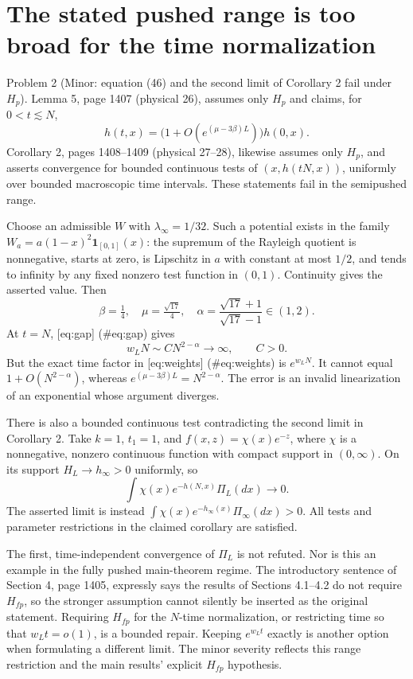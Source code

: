 \documentclass[10pt]{article}
\begin{document}
\section*{The stated pushed range is too broad for the time normalization}
Problem 2 (Minor: equation (46) and the second limit of Corollary 2 fail under \(H_p\)).  Lemma 5, page 1407 (physical 26), assumes only \(H_p\) and claims, for \(0<t\lesssim N\), \[h(t,x)=\bigl(1+O(e^{(\mu-3\beta)L})\bigr)h(0,x).\] Corollary 2, pages 1408–1409 (physical 27–28), likewise assumes only \(H_p\), and asserts convergence for bounded continuous tests of \((x,h(tN,x))\), uniformly over bounded macroscopic time intervals. These statements fail in the semipushed range.\par
Choose an admissible \(W\) with \(\lambda_\infty=1/32\). Such a potential exists in the family \(W_a=a(1-x)^2\mathbf1_{[0,1]}(x)\): the supremum of the Rayleigh quotient is nonnegative, starts at zero, is Lipschitz in \(a\) with constant at most \(1/2\), and tends to infinity by any fixed nonzero test function in \((0,1)\). Continuity gives the asserted value. Then \[\beta=\tfrac14,\quad \mu=\tfrac{\sqrt{17}}4,\quad
 \alpha=\frac{\sqrt{17}+1}{\sqrt{17}-1}\in(1,2).\] At \(t=N\), [eq:gap] (\#eq:gap) gives \[w_LN\sim C N^{2-\alpha}\longrightarrow\infty,\qquad C>0.\] But the exact time factor in [eq:weights] (\#eq:weights) is \(e^{w_LN}\). It cannot equal \(1+O(N^{2-\alpha})\), whereas \(e^{(\mu-3\beta)L}=N^{2-\alpha}\). The error is an invalid linearization of an exponential whose argument diverges.\par
There is also a bounded continuous test contradicting the second limit in Corollary 2. Take \(k=1\), \(t_1=1\), and \(f(x,z)=\chi(x)e^{-z}\), where \(\chi\) is a nonnegative, nonzero continuous function with compact support in \((0,\infty)\). On its support \(H_L\to h_\infty>0\) uniformly, so \[\int \chi(x)e^{-h(N,x)}\Pi_L(dx)\longrightarrow0.\] The asserted limit is instead \(\int\chi(x)e^{-h_\infty(x)}\Pi_\infty(dx)>0\). All tests and parameter restrictions in the claimed corollary are satisfied.\par
The first, time-independent convergence of \(\Pi_L\) is not refuted. Nor is this an example in the fully pushed main-theorem regime. The introductory sentence of Section 4, page 1405, expressly says the results of Sections 4.1–4.2 do not require \(H_{fp}\), so the stronger assumption cannot silently be inserted as the original statement. Requiring \(H_{fp}\) for the \(N\)-time normalization, or restricting time so that \(w_Lt=o(1)\), is a bounded repair. Keeping \(e^{w_Lt}\) exactly is another option when formulating a different limit. The minor severity reflects this range restriction and the main results’ explicit \(H_{fp}\) hypothesis.\par
\end{document}
